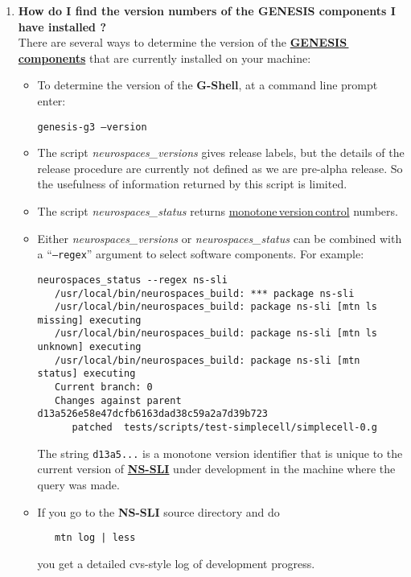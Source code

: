 \documentclass[12pt]{article}
\begin{document}
\begin{enumerate}

\item {\bf How do I find the version numbers of the GENESIS components I have installed ?} \\
There are several ways to determine the version of the \href{../reserved-words/reserved-words.tex}{\bf GENESIS\,components} that are currently installed on your machine:
\begin{itemize}
\item To determine the version of the {\bf G-Shell}, at a command line prompt enter:

{\tt genesis-g3 --version}

\item The script {\it neurospaces\_versions} gives release labels, but the details
of the release procedure are currently not defined as we are pre-alpha release.  So the usefulness of information returned by this script is limited.

\item The script {\it neurospaces\_status} returns \href{../version-control/version-control.tex}{monotone\,version\,control} numbers.

\item Either {\it neurospaces\_versions} or {\it neurospaces\_status} can be combined with a ``{\tt --regex}'' argument to select
software components.  For example:

\begin{verbatim}
neurospaces_status --regex ns-sli
   /usr/local/bin/neurospaces_build: *** package ns-sli
   /usr/local/bin/neurospaces_build: package ns-sli [mtn ls missing] executing
   /usr/local/bin/neurospaces_build: package ns-sli [mtn ls unknown] executing
   /usr/local/bin/neurospaces_build: package ns-sli [mtn status] executing
   Current branch: 0
   Changes against parent d13a526e58e47dcfb6163dad38c59a2a7d39b723
      patched  tests/scripts/test-simplecell/simplecell-0.g
\end{verbatim}

The string {\tt d13a5...} is a monotone version identifier that is
unique to the current version of \href{../nssli/nssli.tex}{\bf NS-SLI}
under development in the machine where the query was made.

\item If you go to the {\bf NS-SLI} source directory and do
\begin{verbatim}
   mtn log | less
\end{verbatim}
you get a detailed cvs-style log of development progress.

\end{itemize}
\end{enumerate}
\end{document}
